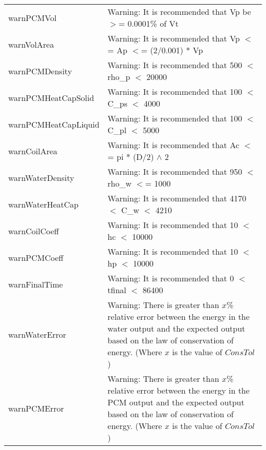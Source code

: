 \documentclass[12pt, titlepage]{article}
\begin{document}
\begin{longtable}{l p{12cm}}
warnPCMVol & Warning: It is recommended that Vp be $>$= 0.0001\% of Vt \\
warnVolArea & Warning: It is recommended that Vp $<$= Ap $<$= (2/0.001) * Vp \\
warnPCMDensity & Warning: It is recommended that 500 $<$ rho\_p $<$ 20000 \\
warnPCMHeatCapSolid & Warning: It is recommended that 100 $<$ C\_ps $<$ 4000 \\
warnPCMHeatCapLiquid & Warning: It is recommended that 100 $<$ C\_pl $<$ 5000 \\
warnCoilArea & Warning: It is recommended that Ac $<$= pi * (D/2) $\wedge$ 2 \\
warnWaterDensity & Warning: It is recommended that 950 $<$ rho\_w $<$= 1000 \\
warnWaterHeatCap & Warning: It is recommended that 4170 $<$ C\_w $<$ 4210 \\
warnCoilCoeff & Warning: It is recommended that 10 $<$ hc $<$ 10000 \\
warnPCMCoeff & Warning: It is recommended that 10 $<$ hp $<$ 10000 \\
warnFinalTime & Warning: It is recommended that 0 $<$ tfinal $<$ 86400 \\
warnWaterError & Warning: There is greater than $x$\% relative error between the energy in the water output and the expected output based on the law of conservation of energy. (Where $x$ is the value of $ConsTol$) \\
warnPCMError & Warning: There is greater than $x$\% relative error between the energy in the PCM output and the expected output based on the law of conservation of energy. (Where $x$ is the value of $ConsTol$) \\
\bottomrule
\end{longtable}
\end{document}
